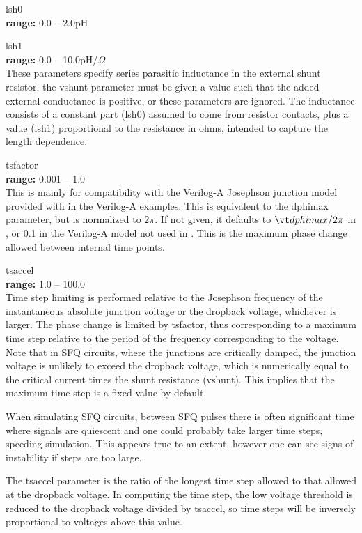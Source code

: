 \begin{description}
\item{\vt lsh0}\\
{\bf range:} 0.0 -- 2.0pH
\item{\vt lsh1}\\
{\bf range:} 0.0 -- 10.0pH/${\Omega}$\\
These parameters specify series parasitic inductance in the external
shunt resistor.  the {\vt vshunt} parameter must be given a value such
that the added external conductance is positive, or these parameters
are ignored.  The inductance consists of a constant part ({\vt lsh0})
assumed to come from resistor contacts, plus a value ({\vt lsh1})
proportional to the resistance in ohms, intended to capture the length
dependence.

\item{\vt tsfactor}\\
{\bf range:} 0.001 -- 1.0\\
This is mainly for compatibility with the Verilog-A Josephson junction
model provided with {\WRspice} in the Verilog-A examples.  This is
equivalent to the {\WRspice} {\vt dphimax} parameter, but is
normalized to $2\pi$.  If not given, it defaults to ${\vt dphimax}/2\pi$
in {\WRspice}, or 0.1 in the Verilog-A model not used in {\WRspice}. 
This is the maximum phase change allowed between internal time points. 

\item{\vt tsaccel}\\
{\bf range:} 1.0 -- 100.0\\
Time step limiting is performed relative to the Josephson frequency of
the instantaneous absolute junction voltage or the dropback voltage,
whichever is larger.  The phase change is limited by {\vt tsfactor},
thus corresponding to a maximum time step relative to the period of
the frequency corresponding to the voltage.  Note that in SFQ
circuits, where the junctions are critically damped, the junction
voltage is unlikely to exceed the dropback voltage, which is
numerically equal to the critical current times the shunt resistance
({\vt vshunt}).  This implies that the maximum time step is a fixed
value by default.

When simulating SFQ circuits, between SFQ pulses there is often
significant time where signals are quiescent and one could probably
take larger time steps, speeding simulation.  This appears true to an
extent, however one can see signs of instability if steps are too
large.

The {\vt tsaccel} parameter is the ratio of the longest time step
allowed to that allowed at the dropback voltage.  In computing the
time step, the low voltage threshold is reduced to the dropback
voltage divided by {\vt tsaccel}, so time steps will be inversely
proportional to voltages above this value.


\end{description}
